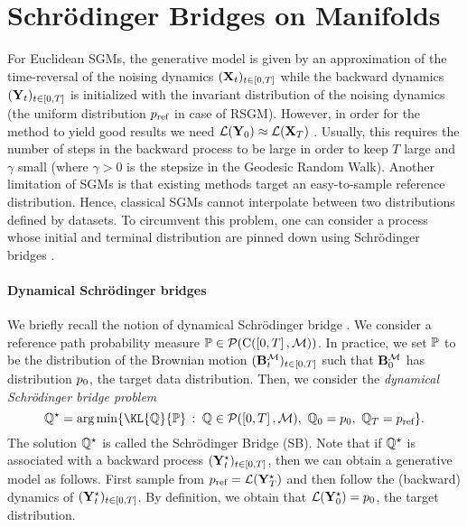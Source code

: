\section{Schr\"odinger Bridges on Manifolds}
\label{sec:extension}


For Euclidean SGMs, the generative model is given by an approximation
of the time-reversal of the noising dynamics $(\mathbf{X}_t)_{t \in \left[0,T\right]}$ while the backward dynamics
$(\mathbf{Y}_t)_{t \in \left[0,T\right]}$ is initialized with the invariant distribution of
the noising dynamics (the uniform distribution $p_{\textup{ref}}$ in case of
RSGM). However, in order for the method to yield good results we need
$\mathcal{L}(\mathbf{Y}_0) \approx \mathcal{L}(\mathbf{X}_T)$ \cite[see][Theorem
1]{debortoli2021neurips}. Usually, this requires the number of steps in the
backward process to be large in order to keep $T$ large and $\gamma$ small
(where $\gamma > 0$ is the stepsize in the Geodesic Random Walk). Another
limitation of SGMs is that existing methods target
an easy-to-sample reference distribution. Hence, classical SGMs
cannot interpolate between two distributions defined by datasets. To
circumvent this problem, one can consider a process whose initial and terminal
distribution are pinned down using Schr\"odinger bridges
\citep{schrodinger1932theorie,leonard2012schrodinger,chen2016entropic,debortoli2021neurips}.

\paragraph{Dynamical Schr\"odinger bridges}
We briefly recall the notion of dynamical Schr\"odinger bridge
\citep{leonard2012schrodinger,chen2016entropic,vargas2021solving,debortoli2021neurips,chen2021likelihood}. We
consider a reference path probability measure
$\mathbb{P} \in \mathcal{P}(\mathrm{C}(\left[0,T\right], \mathcal M))$. In practice, we set $\mathbb{P}$ to be the
distribution of the Brownian motion $(\mathbf{B}_t^\mathcal M)_{t \in \left[0,T\right]}$ such that
$\mathbf{B}_0^\mathcal M$ has distribution $p_0$, the target data distribution. Then, we consider
the \emph{dynamical Schr\"odinger bridge problem}
\begin{equation}
  \Qbb^\star = \argmin \ensembleLigne{\KL{\Qbb}{\Pbb}}{\Qbb \in \Pens(\ccint{0,T}, \M), \ \Qbb_0 = \pizero, \ \Qbb_T = \piinv} . 
\end{equation}
The solution $\mathbb{Q}^\star$ is called the Schr\"odinger Bridge (SB).  Note that if
$\mathbb{Q}^\star$ is associated with a backward process
$(\mathbf{Y}_t^\star)_{t \in \left[0,T\right]}$, then we can obtain a generative model as
follows. First sample from $p_{\textup{ref}} = \mathcal{L}(\mathbf{Y}^\star_T)$ and then follow
the (backward) dynamics of $(\mathbf{Y}^\star_t)_{t \in \left[0,T\right]}$. By definition, we obtain
that $\mathcal{L}(\mathbf{Y}^\star_0) = p_0$, the target distribution.

